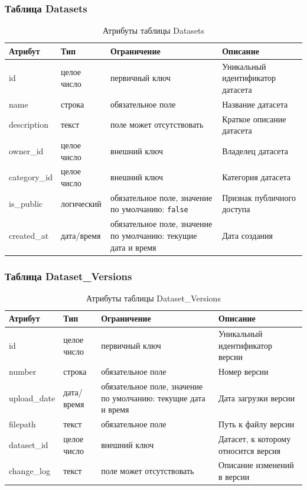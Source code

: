 \subsubsection*{Таблица Datasets}

\begin{table}[H]
\centering
\caption{Атрибуты таблицы Datasets}
\label{tab:datasets}
\renewcommand{\arraystretch}{1.3}
\begin{tabular}{|p{3.5cm}|p{3cm}|p{4cm}|p{4.5cm}|}
\hline
\textbf{Атрибут} & \textbf{Тип} & \textbf{Ограничение} & \textbf{Описание} \\
\hline
id & целое число & первичный ключ & Уникальный идентификатор датасета \\
\hline
name & строка & обязательное поле & Название датасета \\
\hline
description & текст & поле может отсутствовать & Краткое описание датасета \\
\hline
owner\_id & целое число & внешний ключ & Владелец датасета \\
\hline
category\_id & целое число & внешний ключ & Категория датасета \\
\hline
is\_public & логический & обязательное поле, значение по умолчанию: \texttt{false} & Признак публичного доступа \\
\hline
created\_at & дата/время & обязательное поле, значение по умолчанию: текущие дата и время & Дата создания \\
\hline
\end{tabular}
\end{table}

\subsubsection*{Таблица Dataset\_Versions}

\begin{table}[H]
\centering
\caption{Атрибуты таблицы Dataset\_Versions}
\label{tab:dataset_versions}
\renewcommand{\arraystretch}{1.3}
\begin{tabular}{|p{3.5cm}|p{3cm}|p{4cm}|p{4.5cm}|}
\hline
\textbf{Атрибут} & \textbf{Тип} & \textbf{Ограничение} & \textbf{Описание} \\
\hline
id & целое число & первичный ключ & Уникальный идентификатор версии \\
\hline
number & строка & обязательное поле & Номер версии \\
\hline
upload\_date & дата/время & обязательное поле, значение по умолчанию: текущие дата и время & Дата загрузки версии \\
\hline
filepath & текст & обязательное поле & Путь к файлу версии \\
\hline
dataset\_id & целое число & внешний ключ & Датасет, к которому относится версия \\
\hline
change\_log & текст & поле может отсутствовать & Описание изменений в версии \\
\hline
\end{tabular}
\end{table}

